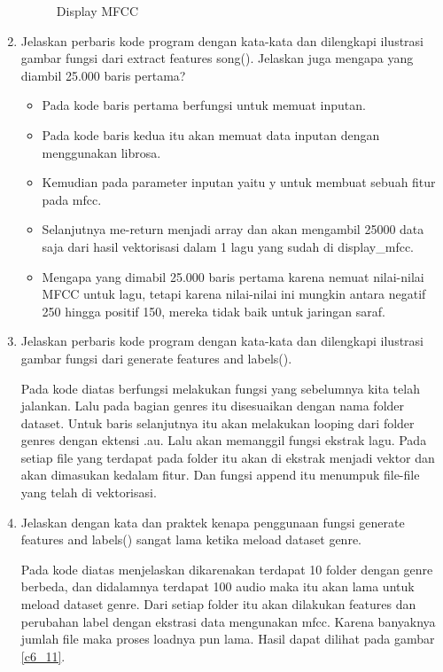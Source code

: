 \begin{enumerate}
\begin{figure}[!htbp]
	\caption{Display MFCC}
	\label{c6_10}
\end{figure} 
\item Jelaskan perbaris kode program dengan kata-kata dan dilengkapi ilustrasi gambar fungsi dari extract features song(). Jelaskan juga mengapa yang diambil 25.000 baris pertama?

\begin{itemize}
\item Pada kode baris pertama berfungsi untuk memuat inputan. 
\item Pada kode baris kedua itu akan memuat data inputan dengan menggunakan librosa.
\item Kemudian pada parameter inputan yaitu y untuk membuat sebuah fitur pada mfcc.
\item Selanjutnya me-return menjadi array dan akan mengambil 25000 data saja dari hasil vektorisasi dalam 1 lagu yang sudah di display\_mfcc.  
\item Mengapa yang dimabil 25.000 baris pertama karena nemuat nilai-nilai MFCC untuk lagu, tetapi karena nilai-nilai ini mungkin antara negatif 250 hingga positif 150, mereka tidak baik untuk jaringan saraf.
\end{itemize}
\item Jelaskan perbaris kode program dengan kata-kata dan dilengkapi ilustrasi gambar fungsi dari generate features and labels().

\subitem Pada kode diatas berfungsi melakukan fungsi yang sebelumnya kita telah jalankan. Lalu pada bagian genres itu disesuaikan dengan nama folder dataset. Untuk baris selanjutnya itu akan melakukan looping dari folder genres dengan ektensi .au. Lalu akan memanggil fungsi ekstrak lagu. Pada setiap file yang terdapat pada folder itu akan di ekstrak menjadi vektor dan akan dimasukan kedalam fitur. Dan fungsi append itu menumpuk file-file yang telah di vektorisasi.
\item Jelaskan dengan kata dan praktek kenapa penggunaan fungsi generate features and labels() sangat lama ketika meload dataset genre.

\subitem Pada kode diatas menjelaskan dikarenakan terdapat 10 folder dengan genre berbeda, dan didalamnya terdapat 100 audio maka itu akan lama untuk meload dataset genre. Dari setiap folder itu akan dilakukan features dan perubahan label dengan ekstrasi data mengunakan mfcc. Karena banyaknya jumlah file maka proses loadnya pun lama. Hasil dapat dilihat pada gambar \ref{c6_11}.

\end{enumerate}
